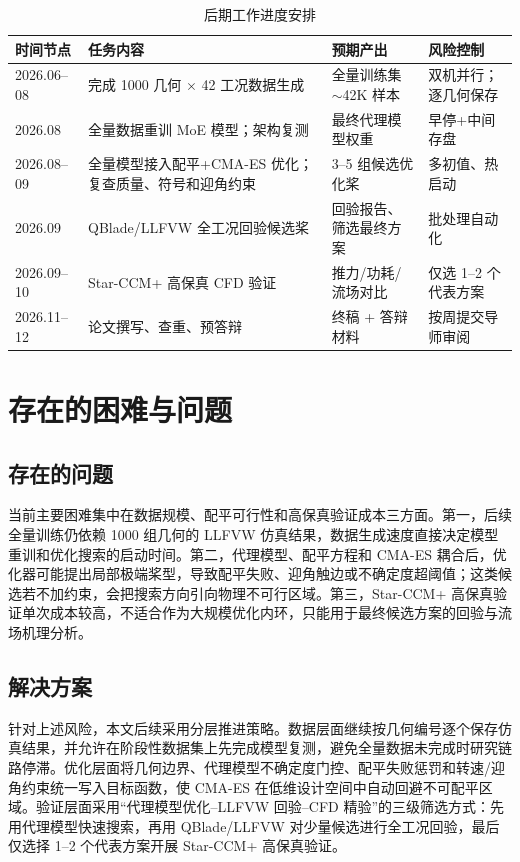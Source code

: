 \begin{table}[H]
  \centering
  \caption{后期工作进度安排}
  \label{tab:future_plan}
  \begin{tabularx}{\textwidth}{p{2.0cm} X p{3.2cm} p{2.8cm}}
    \toprule
    时间节点 & 任务内容 & 预期产出 & 风险控制 \\
    \midrule
    2026.06--08 & 完成 1000 几何 $\times$ 42 工况数据生成 & 全量训练集 $\sim$42K 样本 & 双机并行；逐几何保存 \\
    2026.08 & 全量数据重训 MoE 模型；架构复测 & 最终代理模型权重 & 早停+中间存盘 \\
    2026.08--09 & 全量模型接入配平+CMA-ES 优化；复查质量、符号和迎角约束 & 3--5 组候选优化桨 & 多初值、热启动 \\
    2026.09 & QBlade/LLFVW 全工况回验候选桨 & 回验报告、筛选最终方案 & 批处理自动化 \\
    2026.09--10 & Star-CCM+ 高保真 CFD 验证 & 推力/功耗/流场对比 & 仅选 1--2 个代表方案 \\
    2026.11--12 & 论文撰写、查重、预答辩 & 终稿 + 答辩材料 & 按周提交导师审阅 \\
    \bottomrule
  \end{tabularx}
\end{table}

\section{存在的困难与问题}

\subsection{存在的问题}

当前主要困难集中在数据规模、配平可行性和高保真验证成本三方面。第一，后续全量训练仍依赖 1000 组几何的 LLFVW 仿真结果，数据生成速度直接决定模型重训和优化搜索的启动时间。第二，代理模型、配平方程和 CMA-ES 耦合后，优化器可能提出局部极端桨型，导致配平失败、迎角触边或不确定度超阈值；这类候选若不加约束，会把搜索方向引向物理不可行区域。第三，Star-CCM+ 高保真验证单次成本较高，不适合作为大规模优化内环，只能用于最终候选方案的回验与流场机理分析。

\subsection{解决方案}

针对上述风险，本文后续采用分层推进策略。数据层面继续按几何编号逐个保存仿真结果，并允许在阶段性数据集上先完成模型复测，避免全量数据未完成时研究链路停滞。优化层面将几何边界、代理模型不确定度门控、配平失败惩罚和转速/迎角约束统一写入目标函数，使 CMA-ES 在低维设计空间中自动回避不可配平区域。验证层面采用“代理模型优化--LLFVW 回验--CFD 精验”的三级筛选方式：先用代理模型快速搜索，再用 QBlade/LLFVW 对少量候选进行全工况回验，最后仅选择 1--2 个代表方案开展 Star-CCM+ 高保真验证。

